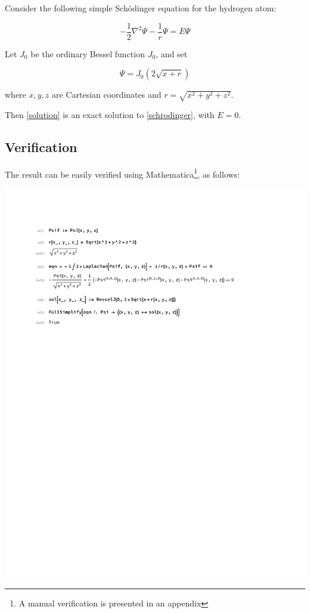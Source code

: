 \documentclass{article}
\begin{document}
Consider the following simple Sch\"odinger equation for the hydrogen atom:

\begin{equation}
\label{schrodinger}
-\frac{1}{2}\nabla^2 \Psi - \frac{1}{r}\Psi = E \Psi
\end{equation}

Let $J_0$ be the ordinary Bessel function $J_0$, and set

\begin{equation}
\label{solution}
\Psi = J_0(2\sqrt{x+r})
\end{equation}

where $x,y,z$ are Cartesian coordinates and $r=\sqrt{x^2+y^2+z^2}$.

\vskip 12pt

Then \eqref{solution} is an exact solution to \eqref{schrodinger}, with $E=0$.

\subsection*{Verification}

\label{verification}
The result can be easily verified using Mathematica\footnote{A manual verification is presented in an appendix}, as follows:

\includegraphics[page=1, clip, trim=1in 7in 1in 1in, width=\textwidth]{improved.pdf}
\end{document}

